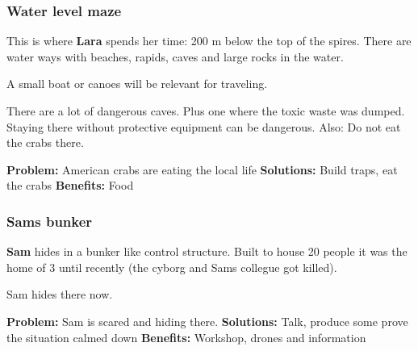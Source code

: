 \subsubsection{Water level maze}

This is where \textbf{Lara} spends her time: 200 m below the top of the spires. There are water ways with beaches, rapids, caves and large rocks in the water.

A small boat or canoes will be relevant for traveling.

There are a lot of dangerous caves. Plus one where the toxic waste was dumped. Staying there without protective equipment can be dangerous. Also: Do not eat the crabs there.


\textbf{Problem:} American crabs are eating the local life
\textbf{Solutions:} Build traps, eat the crabs
\textbf{Benefits:} Food

\subsubsection{Sams bunker}

\textbf{Sam} hides in a bunker like control structure. Built to house 20 people it was the home of 3 until recently (the cyborg and Sams collegue got killed).

Sam hides there now.

\textbf{Problem:} Sam is scared and hiding there.
\textbf{Solutions:} Talk, produce some prove the situation calmed down
\textbf{Benefits:} Workshop, drones and information


